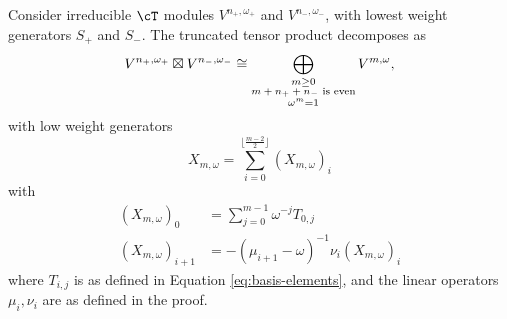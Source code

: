 \documentclass[12pt]{article}
\begin{document}
\begin{thm}
Consider irreducible $\cT$ modules $V^{n_+, \omega_+}$ and $V^{n_-, \omega_-}$, with lowest weight generators $S_+$ and $S_-$.
The truncated tensor product decomposes as
$$
V^{n_+, \omega_+} \boxtimes V^{n_-, \omega_-} 
\cong 
\bigoplus_{\substack{m \geq 0 \\ \text{$m + n_+  + n_-$ is even} \\ \omega^m = 1}} V^{m, \omega},
$$
with low weight generators 
$$
X_{m, \omega} 
= 
\sum_{i=0}^{\lfloor\frac{m-2}{2}\rfloor}
\left(X_{m,\omega}\right)_i
$$
with
\begin{align*}
\left(X_{m,\omega}\right)_0 & =  \sum_{j=0}^{m-1} \omega^{-j} T_{0,j} \\
\left(X_{m,\omega}\right)_{i+1} & = - (\mu_{i+1} - \omega)^{-1} \nu_i \left(X_{m,\omega}\right)_i
\end{align*}
where $T_{i,j}$ is as defined in Equation \eqref{eq:basis-elements}, and the linear operators $\mu_i, \nu_i$ are as defined in the proof.
\end{thm}
\end{document}
